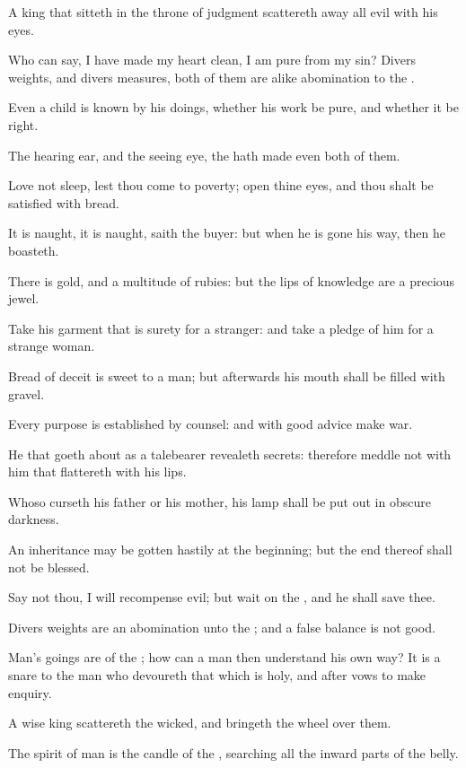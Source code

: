 \verse A king that sitteth in the throne of judgment scattereth away all evil with his eyes.

\verse Who can say, I have made my heart clean, I am pure from my sin?  \verse Divers weights, and divers measures, both of them are alike abomination to the \LORD.

\verse Even a child is known by his doings, whether his work be pure, and whether it be right.

\verse The hearing ear, and the seeing eye, the \LORD hath made even both of them.

\verse Love not sleep, lest thou come to poverty; open thine eyes, and thou shalt be satisfied with bread.

\verse It is naught, it is naught, saith the buyer: but when he is gone his way, then he boasteth.

\verse There is gold, and a multitude of rubies: but the lips of knowledge are a precious jewel.

\verse Take his garment that is surety for a stranger: and take a pledge of him for a strange woman.

\verse Bread of deceit is sweet to a man; but afterwards his mouth shall be filled with gravel.

\verse Every purpose is established by counsel: and with good advice make war.

\verse He that goeth about as a talebearer revealeth secrets: therefore meddle not with him that flattereth with his lips.

\verse Whoso curseth his father or his mother, his lamp shall be put out in obscure darkness.

\verse An inheritance may be gotten hastily at the beginning; but the end thereof shall not be blessed.

\verse Say not thou, I will recompense evil; but wait on the \LORD, and he shall save thee.

\verse Divers weights are an abomination unto the \LORD; and a false balance is not good.

\verse Man's goings are of the \LORD; how can a man then understand his own way?  \verse It is a snare to the man who devoureth that which is holy, and after vows to make enquiry.

\verse A wise king scattereth the wicked, and bringeth the wheel over them.

\verse The spirit of man is the candle of the \LORD, searching all the inward parts of the belly.

